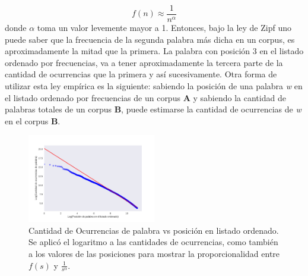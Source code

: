 $$f(n) \approx \frac{1}{n^{\alpha}}$$
donde $\alpha$ toma un valor levemente mayor a 1.
Entonces, bajo la ley de Zipf uno puede saber que la frecuencia de la segunda palabra más dicha en un corpus, es aproximadamente la mitad que la primera. La palabra con posición 3 en el listado ordenado por frecuencias, va a tener aproximadamente la tercera parte de la cantidad de ocurrencias que la primera y así sucesivamente. Otra forma de utilizar esta ley empírica es la siguiente:
sabiendo la posición de una palabra \textit{w} en el listado ordenado por frecuencias de un corpus \textbf{A} y sabiendo la cantidad de palabras totales de un corpus \textbf{B}, puede estimarse la cantidad de ocurrencias de \textit{w} en el corpus \textbf{B}.
\begin{figure}[!ht]
\centering
\includegraphics[width=0.5\textwidth]{./images/zipf.pdf}
\caption{Cantidad de Ocurrencias de palabra vs posición en listado ordenado. Se aplicó el logaritmo a las cantidades de ocurrencias, como también a los valores de las posiciones para mostrar la proporcionalidad entre $f(s)$ y $\frac{1}{s^{\alpha}}$.} 
\label{fig:zipf} 
\end{figure}










